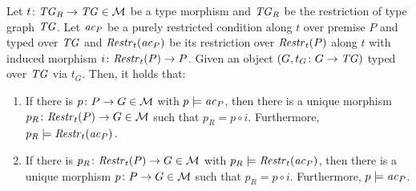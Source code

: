 \begin{lemma}
\label{lem:sec-dc-general-res:comp_res_sat_III}
Let $t\colon \mathit{TG}_R \to \mathit{TG} \in {\cal M}$ be a type morphism and $\mathit{TG}_R$ be the restriction of type graph $\mathit{TG}$.
Let $\mathit{ac}_P$ be a purely restricted condition along $t$ over premise $P$ and typed over $\mathit{TG}$ and $\mathit{Restr}_t(\mathit{ac}_P)$ be its restriction over $\mathit{Restr}_t(P)$ along $t$ with induced morphism $i\colon \mathit{Restr}_t(P) \to P$.
Given an object $(G,t_G\colon G \to \mathit{TG})$ typed over $\mathit{TG}$ via $t_G$.
Then, it holds that:
\begin{enumerate}
  \item \label{item:sec-dc-general-res:comp_res_sat_III:1} If there is $p\colon P \to G \in {\cal M}$ with $p \models \mathit{ac}_P$, then there is a unique morphism $p_R\colon \mathit{Restr}_t(P) \to G \in {\cal M}$ such that $p_R=p \circ i$.
  Furthermore, $p_R \models \mathit{Restr}_t(\mathit{ac}_P)$.
  \item \label{item:sec-dc-general-res:comp_res_sat_III:2} If there is $p_R\colon \mathit{Restr}_t(P) \to G \in {\cal M}$ with $p_R \models \mathit{Restr}_t(\mathit{ac}_P)$, then there is a unique morphism $p\colon P \to G \in {\cal M}$ such that $p_R=p \circ i$.
  Furthermore, $p \models \mathit{ac}_P$.
\end{enumerate} 
\envEndMarker
\end{lemma}

